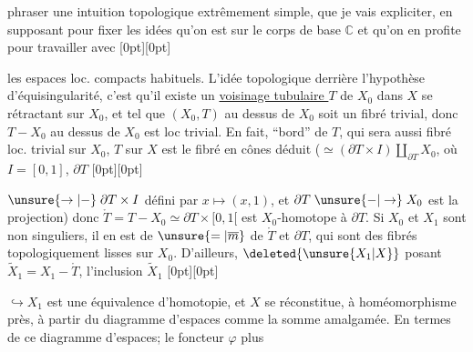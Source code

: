 %
phraser une intuition topologique extrêmement simple, que je vais expliciter, en supposant pour fixer les idées qu'on est sur le corps de base $\mathbb C$ et qu'on en profite pour travailler avec
\raisebox{0pt}[0pt][0pt]{\parbox{0pt}{}}%
les espaces loc. compacts habituels. L'idée topologique derrière l'hypothèse d'équisingularité, c'est qu'il existe un \uline{voisinage tubulaire $T$} de $X_0$ dans $X$ se rétractant sur $X_0$, et tel que $(X_0,T)$ au dessus de $X_0$ soit un fibré  trivial, donc $T-X_0$ au dessus de $X_0$ est loc trivial. En fait,   ``bord'' de $T$, qui sera aussi fibré loc. trivial sur $X_0$, $T$ sur $X$ est le fibré en cônes déduit ($\simeq(\partial T\times I)\amalg_{\partial T}X_0$, où $I=[0,1]$, $\partial T$%
\raisebox{1.3ex}[0pt][0pt]{\parbox{0pt}{}}%
$\mathrel{\unsure{\to|-}}\partial T\times I$ défini par $x\mapsto(x,1)$, et $\partial T\mathrel{\unsure{-|\to}}X_0$ est la projection) donc $\mathring T=T-X_0\simeq\partial T\times[0,1[$ est $X_0$-homotope à $\partial T$. Si $X_0$ et $X_1$ sont non singuliers, il en est de $\unsure{=|\overline m}$ de $\mathring T$ et $\partial T$, qui sont des fibrés topologiquement lisses sur $X_0$. D'ailleurs, $\deleted{\unsure{X_1|X}}$ posant $\widetilde X_1=X_1-\mathring T$,  l'inclusion $\widetilde X_1$%
\raisebox{-2.3ex}[0pt][0pt]{\parbox{0pt}{}}%
$\hookrightarrow X_1$ est une équivalence d'homotopie, et $X$ se réconstitue, à homéomorphisme près, à partir du diagramme d'espaces
comme la somme amalgamée. En termes de ce diagramme d'espaces; le foncteur $\varphi$ plus
